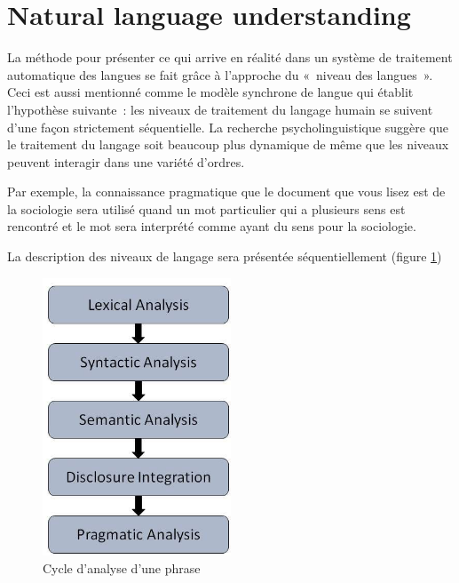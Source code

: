 \section{Natural language understanding}

	La méthode pour présenter ce qui arrive en réalité dans un système de traitement automatique des langues se fait grâce à l'approche du « niveau des langues ». Ceci est aussi mentionné comme le modèle synchrone de langue qui établit l’hypothèse suivante : les niveaux de traitement du langage humain se suivent d’une façon strictement séquentielle. La recherche psycholinguistique suggère que le traitement du langage soit beaucoup plus dynamique de même que les niveaux peuvent interagir dans une variété d'ordres. 
\vspace{1em}
		
Par exemple, la connaissance pragmatique que le document que vous lisez est de la sociologie sera utilisé quand un mot particulier qui a plusieurs sens est rencontré et le mot sera interprété comme ayant du sens pour la sociologie. 
	\vspace{1em}
	
La description des niveaux de langage sera présentée séquentiellement (figure \ref{fig:Cycle d'analyse d'une phrase})

	\vspace{1em}
	
\begin{figure}[H]
	\centering
		\includegraphics[width = 0.5\textwidth]{phaseAnalyse.png}
	\caption{Cycle d'analyse d'une phrase}
	\label{fig:Cycle d'analyse d'une phrase}
\end{figure}

